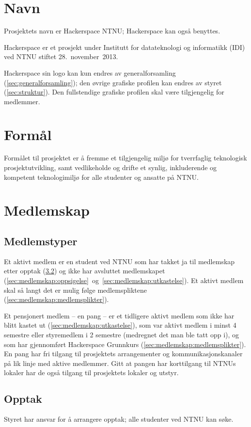 \section{Navn}\label{sec:navn}
Prosjektets navn er Hackerspace NTNU; Hackerspace kan også benyttes.

Hackerspace er et prosjekt under Institutt for datateknologi og informatikk (IDI) ved NTNU stiftet 28.~november~2013.

Hackerspace sin logo kan kun endres av generalforsamling (\ref{sec:generalforsamling}); den øvrige grafiske profilen kan endres av styret (\ref{sec:struktur}). Den fullstendige grafiske profilen skal være tilgjengelig for medlemmer.


\section{Formål}\label{sec:formål}
Formålet til prosjektet er å fremme et tilgjengelig miljø for tverrfaglig teknologisk prosjektutvikling, samt vedlikeholde og drifte et synlig, inkluderende og kompetent teknologimiljø for alle studenter og ansatte på NTNU.\@


\section{Medlemskap}\label{sec:medlemskap}
\subsection{Medlemstyper}\label{sec:medlemskap:medlemstyper}
Et aktivt medlem er en student ved NTNU som har takket ja til medlemskap etter opptak (\ref{sec:medlemskap:opptak}) og ikke har avsluttet medlemskapet (\ref{sec:medlemskap:oppsigelse}~og~\ref{sec:medlemskap:utkastelse}).
Et aktivt medlem skal så langt det er mulig følge medlemspliktene (\ref{sec:medlemskap:medlemsplikter}).

Et pensjonert medlem -- en pang -- er et tidligere aktivt medlem som ikke har blitt kastet ut (\ref{sec:medlemskap:utkastelse}), som var aktivt medlem i minst 4 semestre eller styremedlem i 2 semestre (medregnet det man ble tatt opp i), og som har gjennomført Hackerspace Grunnkurs (\ref{sec:medlemskap:medlemsplikter}).
En pang har fri tilgang til prosjektets arrangementer og kommunikasjonskanaler på lik linje med aktive medlemmer. 
Gitt at pangen har korttilgang til NTNUs lokaler har de også tilgang til prosjektets lokaler og utstyr.

\subsection{Opptak}\label{sec:medlemskap:opptak}
Styret har ansvar for å arrangere opptak; alle studenter ved NTNU kan søke.

